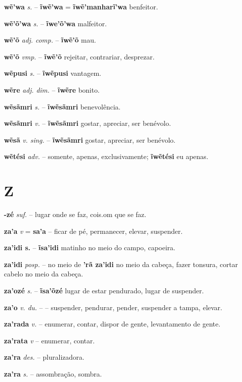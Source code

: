 \textbf{wẽ'wa} \textit{s.} -- \textbf{ĩwẽ'wa} = \textbf{ĩwẽ'manharĩ'wa} benfeitor.

\textbf{wẽ'õ'wa} \textit{s.} -- \textbf{ĩwe'õ'wa} malfeitor.

\textbf{wẽ'õ} \textit{adj. comp.} -- \textbf{ĩwẽ'õ} mau.

\textbf{wẽ'õ} \textit{vmp.} -- \textbf{ĩwẽ'õ} rejeitar, contrariar, desprezar.

\textbf{wẽpusi} \textit{s.} -- \textbf{ĩwẽpusi} vantagem.

\textbf{wẽre} \textit{adj. dim.} -- \textbf{ĩwẽre} bonito.

\textbf{wẽsãmri} \textit{s.} -- \textbf{ĩwẽsãmri} benevolência.

\textbf{wẽsãmri} \textit{v.} -- \textbf{ĩwẽsãmri} gostar, apreciar, ser benévolo.

\textbf{wẽsã} \textit{v. sing.} -- \textbf{ĩwẽsãmri} gostar, apreciar, ser benévolo.

\textbf{wẽtési} \textit{adv.} -- somente, apenas, exclusivamente; \textbf{ĩwẽtési} eu apenas.


\section*{Z}



\textbf{-zé} \textit{suf.} -- lugar onde se faz, cois.om que se faz.

\textbf{za'a} \textit{v} = \textbf{sa'a} -- ficar de pé, permanecer, elevar, suspender.

\textbf{za'idi s.} -- \textbf{ĩsa'idi} matinho no meio do campo, capoeira.

\textbf{za'idi} \textit{posp.} -- no meio de  \textbf{'rã za'idi} no meio da cabeça, fazer tonsura, cortar cabelo no meio da cabeça.

\textbf{za'ozé} \textit{s.} -- \textbf{ĩsa'õzé} lugar de estar pendurado, lugar de suspender.

\textbf{za'o} \textit{v. du.} -- -- suspender, pendurar, pender, suspender a tampa, elevar.

\textbf{za'rada} \textit{v.} -- enumerar, contar, dispor de gente, levantamento de gente.

\textbf{za'rata} \textit{v} -- enumerar, contar.

\textbf{za'ra} \textit{des.} -- pluralizadora.

\textbf{za'ra} \textit{s.} -- assombração, sombra.

